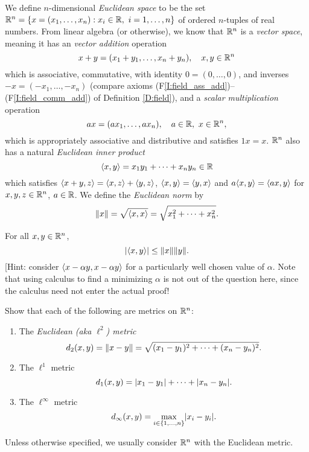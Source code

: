 \documentclass{book}
\begin{document}
\begin{defn}
We define $n$-dimensional {\em Euclidean space} to be the set $\mathbb{R}^n = \left\{ x
= (x_1,\ldots,x_n) : x_i \in \mathbb{R}, \ i = 1, \ldots, n \right\}$ of ordered $n$-tuples
of real numbers. From linear algebra (or otherwise), we know that $\mathbb{R}^n$ is a
{\em vector space}, meaning it has an {\em vector addition} operation
\[
	x + y = (x_1 + y_1, \ldots, x_n + y_n), \quad x,y \in \mathbb{R}^n
\]
which is associative, commutative, with identity $0 = (0,\ldots,0)$, and
inverses $-x = (-x_1,\ldots,-x_n)$ (compare axioms
(F\ref{I:field_ass_add})--(F\ref{I:field_comm_add}) of Definition
\ref{D:field}), and a {\em scalar multiplication} operation
\[
	ax = (ax_1,\ldots, ax_n), \quad a \in \mathbb{R},\ x \in \mathbb{R}^n,
\]
which is appropriately associative and distributive and satisfies $1x = x$.
$\mathbb{R}^n$ also has a natural {\em Euclidean inner product}
\[
	\left\langle x,y\right\rangle = x_1 y_1 + \cdots +x_n y_n \in \mathbb{R}
\]
which satisfies $\left\langle x + y, z\right\rangle = \left\langle x, z\right\rangle + \left\langle y, z\right\rangle$, $\left\langle x,y\right\rangle =
\left\langle y,x\right\rangle$ and $a\!\left\langle x,y\right\rangle = \left\langle ax,y\right\rangle$ for $x,y,z \in \mathbb{R}^n$, $a \in
\mathbb{R}$. We define the {\em Euclidean norm} by
\[
	\lVert x\rVert = \sqrt{\left\langle x,x\right\rangle} = \sqrt{x_1^2 + \cdots + x_n^2}.
\]
\label{D:Rn}
\end{defn}

\begin{lem}

For all $x,y \in \mathbb{R}^n$, 
\[
	\lvert\left\langle x,y\right\rangle\rvert \leq \lVert x\rVert \lVert y\rVert.
\]
[Hint: consider $\left\langle x - \alpha y, x - \alpha y\right\rangle$ for a particularly well chosen
value of $\alpha$. Note that using calculus to find a minimizing $\alpha$ is not out of the question here,
since the calculus need not enter the actual proof!
\label{L:cauchy_scwartz}
\end{lem}

\begin{ex}
Show that each of the following are metrics on $\mathbb{R}^n$:
\begin{enumerate}
\item The {\em Euclidean (aka $\ell^2$) metric}
\[
	d_2(x,y) = \lVert x - y\rVert = \sqrt{(x_1 - y_1)^2 + \cdots + (x_n - y_n)^2}.
\]
\item The $\ell^1$ metric
\[
	d_1(x,y) = \lvert x_1 - y_1\rvert + \cdots + \lvert x_n - y_n\rvert.
\]
\item The $\ell^\infty$ metric
\[
	d_\infty(x,y) = \max_{i\in \left\{ 1,\ldots,n \right\}} \lvert x_i - y_i\rvert.
\]
\end{enumerate}
Unless otherwise specified, we usually consider $\mathbb{R}^n$ with the Euclidean metric.
\label{X:Rn_metric}
\end{ex}
\end{document}
